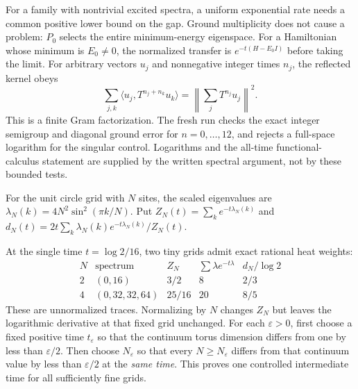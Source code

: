 For a family with nontrivial excited spectra, a uniform exponential rate needs a common positive lower bound on the gap. Ground multiplicity does not cause a problem: $P_0$ selects the entire minimum-energy eigenspace. For a Hamiltonian whose minimum is $E_0\ne0$, the normalized transfer is $e^{-t(H-E_0I)}$ before taking the limit.
For arbitrary vectors $u_j$ and nonnegative integer times $n_j$, the reflected kernel obeys
\[
\sum_{j,k}\langle u_j,T^{n_j+n_k}u_k\rangle
=\left\|\sum_jT^{n_j}u_j\right\|^2.
\]
This is a finite Gram factorization. The fresh run checks the exact integer semigroup and diagonal ground error for $n=0,\ldots,12$, and rejects a full-space logarithm for the singular control. Logarithms and the all-time functional-calculus statement are supplied by the written spectral argument, not by these bounded tests.

For the unit circle grid with $N$ sites, the scaled eigenvalues are $\lambda_N(k)=4N^2\sin^2(\pi k/N)$. Put $Z_N(t)=\sum_ke^{-t\lambda_N(k)}$ and $d_N(t)=2t\sum_k\lambda_N(k)e^{-t\lambda_N(k)}/Z_N(t)$.

At the single time $t=\log2/16$, two tiny grids admit exact rational heat weights:
\[
\begin{array}{c|c|c|c|c}
N&\text{spectrum}&Z_N&\sum\lambda e^{-t\lambda}&d_N/\log2\\\hline
2&(0,16)&3/2&8&2/3\\
4&(0,32,32,64)&25/16&20&8/5
\end{array}
\]
These are unnormalized traces. Normalizing by $N$ changes $Z_N$ but leaves the logarithmic derivative at that fixed grid unchanged.
For each $\varepsilon>0$, first choose a fixed positive time $t_\varepsilon$ so that the continuum torus dimension differs from one by less than $\varepsilon/2$. Then choose $N_\varepsilon$ so that every $N\geq N_\varepsilon$ differs from that continuum value by less than $\varepsilon/2$ at the \emph{same time}. This proves one controlled intermediate time for all sufficiently fine grids.


